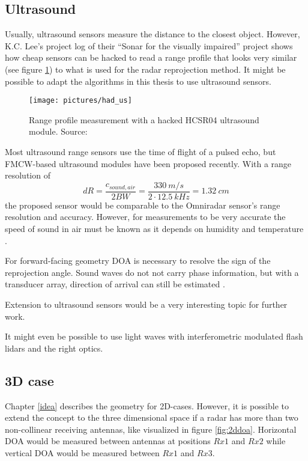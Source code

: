 \subsection{Ultrasound}\label{ultrasound}

Usually, ultrasound sensors measure the distance to the closest object.
However, K.C. Lee's project log of their ``Sonar for the visually
impaired'' project \cite{Lee2015} shows how cheap sensors can be hacked
to read a range profile that looks very similar (see figure \cref{fig:had_us}) to
what is used for the radar reprojection method. It might be possible to
adapt the algorithms in this thesis to use ultrasound sensors.

\begin{figure}[htp]
    \centering
    \texttt{[image: pictures/had\_us]}
    \caption{\label{fig:had_us}Range profile measurement with a hacked HCSR04 ultrasound module. Source: \cite{Lee2015}}
\end{figure}

Most ultrasound range sensors use the time of flight of a pulsed echo,
but FMCW-based ultrasound modules have been proposed
\cite{Battaglini2014} recently. With a range resolution of
\[dR = \frac{c_{sound, air}}{2 BW} = \frac{\SI{330}{m\per s}}{2\cdot \SI{12.5}{kHz}} = \SI{1.32}{cm}\]
the proposed sensor would be comparable to the Omniradar sensor's range
resolution and accuracy. However, for measurements to be very accurate
the speed of sound in air must be known as it depends on humidity and
temperature \cite{Bohn1987}.

For forward-facing geometry DOA is necessary to resolve the sign of the
reprojection angle. Sound waves do not not carry phase information, but
with a transducer array, direction of arrival can still be estimated
\cite{Kunin2010}.

Extension to ultrasound sensors would be a very interesting topic for
further work.

It might even be possible to use light waves with interferometric
modulated flash lidars and the right optics.

\subsection{3D case}\label{three-d-case}

Chapter \cref{idea} describes the geometry for 2D-cases. However, it
is possible to extend the concept to the three dimensional space if a
radar has more than two non-collinear receiving antennas, like
visualized in figure \cref{fig:2ddoa}. Horizontal DOA would be measured between
antennas at positions \(Rx1\) and \(Rx2\) while vertical DOA would be
measured between \(Rx1\) and \(Rx3\).

